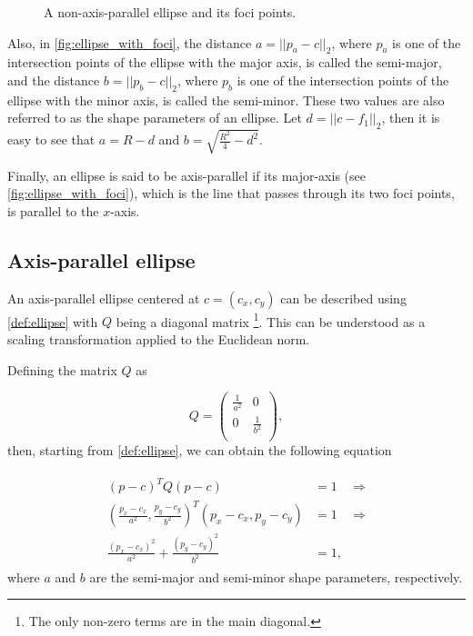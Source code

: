 \begin{figure}[H]
    \centering
    
    \caption{A non-axis-parallel ellipse and its foci points.}
    
    \fautor
    \label{fig:ellipse_with_foci}
\end{figure}

Also, in \autoref{fig:ellipse_with_foci}, the distance $a = ||p_a - c||_2$, where $p_a$ is one of the intersection points of the ellipse with the major axis, is called the semi-major, and the distance $b = ||p_b-c||_2$, where $p_b$ is one of the intersection points of the ellipse with the minor axis, is called the semi-minor. These two values are also referred to as the shape parameters of an ellipse. Let $d = ||c-f_1||_2$, then it is easy to see that $a = R - d$ and $b = \sqrt{\frac{R^2}{4} - d^2}$.

Finally, an ellipse is said to be axis-parallel if its major-axis (see \autoref{fig:ellipse_with_foci}), which is the line that passes through its two foci points, is parallel to the $x$-axis.

\subsection{Axis-parallel ellipse}

An axis-parallel ellipse centered at $c = (c_x,c_y)$ can be described using \autoref{def:ellipse} with $Q$ being a diagonal matrix \footnote{The only non-zero terms are in the main diagonal.}. This can be understood as a scaling transformation applied to the Euclidean norm.

Defining the matrix $Q$ as

\[
Q=
\left( {\begin{array}{cc}
    \frac{1}{a^2} & 0 \\
    0 & \frac{1}{b^2} \\
    \end{array} } \right),
\]
then, starting from \autoref{def:ellipse}, we can obtain the following equation

 \begin{align}\label{equation:pellipse}
 \begin{aligned}
 (p-c)^{T}Q(p-c) &= 1 & \Rightarrow \\
 (\frac{p_x-c_x}{a^2}, \frac{p_y-c_y}{b^2})^{T}(p_x-c_x, p_y-c_y) &= 1 & \Rightarrow\\
  \frac{(p_x-c_x)^2}{a^2} + \frac{(p_y-c_y)^2}{b^2} &= 1,&
   \end{aligned}
 \end{align}
where $a$ and $b$ are the semi-major and semi-minor shape parameters, respectively.

